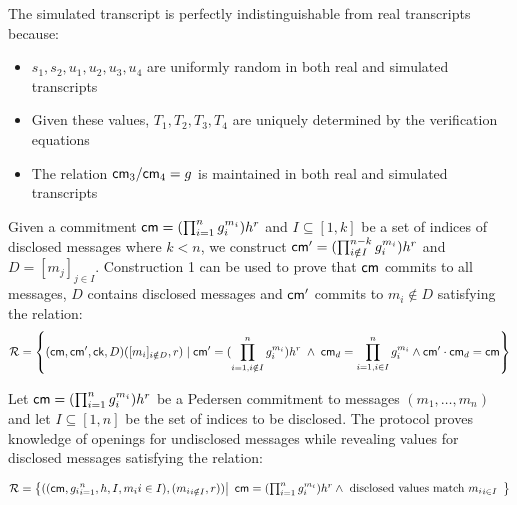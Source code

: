 \noindent The simulated transcript is perfectly indistinguishable from real transcripts because:
\begin{itemize}
    \item $s_1,s_2,u_1,u_2,u_3,u_4$ are uniformly random in both real and simulated transcripts
    \item Given these values, $T_1,T_2,T_3,T_4$ are uniquely determined by the verification equations
    \item The relation $\mathsf{cm}_3/\mathsf{cm}_4 = g$ is maintained in both real and simulated transcripts
\end{itemize}


\begin{corollary}
Given a commitment $\mathsf{cm} = (\prod_{i=1}^ng_i^{m_i})h^r$ and $I \subseteq [1,k]$ be a set of indices of disclosed messages where $k < n$, we construct $\mathsf{cm}' = (\prod_{i \notin I}^{n-k}g_i^{m_i})h^r $ and $D = [m_j]_{j\in I}$. Construction 1 can be used to prove that $\mathsf{cm}$ commits to all messages, $D$ contains disclosed messages and $\mathsf{cm}'$ commits to $m_i \notin D$ satisfying the relation:
\[
    \mathcal{R} = \left\{(\mathsf{cm}, \mathsf{cm}', \mathsf{ck}, D)([m_i]_{i\notin D}, r) \; |  \; \mathsf{cm}' = (\prod_{i=1, i \notin I}^n g_i^{m_i})h^r \; \wedge \; \mathsf{cm}_d = \prod_{i=1, i \in I}^n g_i^{m_i} \wedge \mathsf{cm}' \cdot \mathsf{cm}_d = \mathsf{cm}
    \right\}
\]
\end{corollary}

\begin{corollary}
Let $\mathsf{cm} = (\prod_{i=1}^n g_i^{m_i})h^r$ be a Pedersen commitment to messages $(m_1,\ldots,m_n)$ and let $I \subseteq [1,n]$ be the set of indices to be disclosed. The protocol proves knowledge of openings for undisclosed messages while revealing values for disclosed messages satisfying the relation:

\[
\mathcal{R} = \left\{ ((\mathsf{cm}, {g_i}_{i=1}^n, h, I, {m_i}{i \in I}), ({m_i}_{i \notin I}, r)) \middle|
\begin{array}{l}
\mathsf{cm} = (\prod_{i=1}^n g_i^{m_i})h^r \wedge \
\text{disclosed values match } {m_i}_{i \in I}
\end{array} \right\}
\]


\end{corollary}




